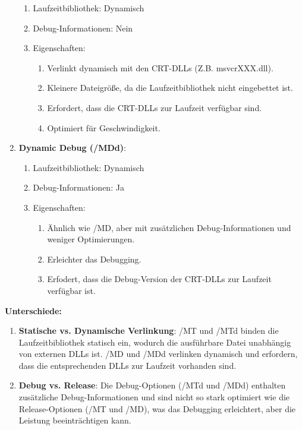 \documentclass{article}
\begin{document}
\begin{enumerate}
		\begin{enumerate}
			\item Laufzeitbibliothek: Dynamisch
			\item Debug-Informationen: Nein
			\item Eigenschaften:
			\begin{enumerate}
				\item Verlinkt dynamisch mit den CRT-DLLs (Z.B. msvcrXXX.dll).
				\item Kleinere Dateigröße, da die Laufzeitbibliothek nicht eingebettet ist.
				\item Erfordert, dass die CRT-DLLs zur Laufzeit verfügbar sind.
				\item Optimiert für Geschwindigkeit.
			\end{enumerate}
		\end{enumerate}
		\item \textbf{Dynamic Debug (/MDd)}:
		\begin{enumerate}
			\item Laufzeitbibliothek: Dynamisch
			\item Debug-Informationen: Ja
			\item Eigenschaften:
			\begin{enumerate}
				\item Ähnlich wie /MD, aber mit zusätzlichen Debug-Informationen und weniger Optimierungen.
				\item Erleichter das Debugging.
				\item Erfodert, dass die Debug-Version der CRT-DLLs zur Laufzeit verfügbar ist.
			\end{enumerate}
		\end{enumerate}
	\end{enumerate}
	
	\textbf{Unterschiede:}\\
	\begin{enumerate}
		\item \textbf{Statische vs. Dynamische Verlinkung}: /MT und /MTd binden die Laufzeitbibliothek statisch ein, wodurch die ausführbare Datei unabhängig von externen DLLs ist. /MD und /MDd verlinken dynamisch und erfordern, dass die entsprechenden DLLs zur Laufzeit vorhanden sind.
		\item \textbf{Debug vs. Release}: Die Debug-Optionen (/MTd und /MDd) enthalten zusätzliche Debug-Informationen und sind nicht so stark optimiert wie die Release-Optionen (/MT und /MD), was das Debugging erleichtert, aber die Leistung beeinträchtigen kann. 
	\end{enumerate}
	
\end{document}
